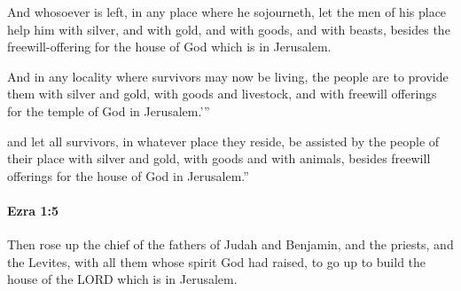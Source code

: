 			\begin{versebox}
					\item[BHS] 
					\item[LXX] 
					\item[ASV] And whosoever is left, in any place where he sojourneth, let the men of his place help him with silver, and with gold, and with goods, and with beasts, besides the freewill-offering for the house of God which is in Jerusalem.
					\item[NIV] And in any locality where survivors may now be living, the people are to provide them with silver and gold, with goods and livestock, and with freewill offerings for the temple of God in Jerusalem.’”
					\item[NRSV] and let all survivors, in whatever place they reside, be assisted by the people of their place with silver and gold, with goods and with animals, besides freewill offerings for the house of God in Jerusalem.”
			\end{versebox}

		\paragraph{Ezra 1:5} %
			\label{EZRA-1-5}

			Then rose up the chief of the fathers of Judah and Benjamin, and the priests, and the Levites, with all them whose spirit God had raised, to go up to build the house of the LORD which is in Jerusalem.

